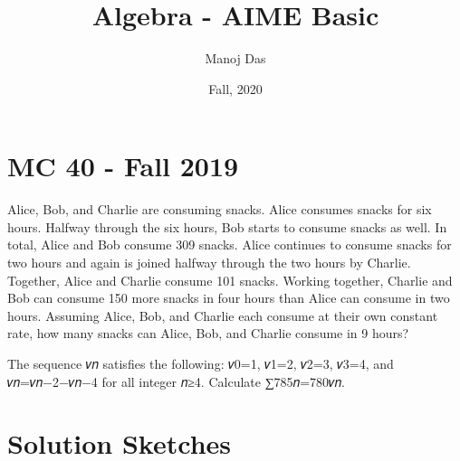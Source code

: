 \documentclass[11pt,twoside]{scrartcl}
\begin{document}
\title{Algebra - AIME Basic}

\author{Manoj Das}
\date{Fall, 2020}

\maketitle
\section{MC 40 - Fall 2019}
\begin{problem}
Alice, Bob, and Charlie are consuming snacks. Alice consumes snacks for six hours. Halfway through the six hours, Bob starts to consume snacks as well. In total, Alice and Bob consume 309 snacks. Alice continues to consume snacks for two hours and again is joined halfway through the two hours by Charlie. Together, Alice and Charlie consume 101 snacks. Working together, Charlie and Bob can consume 150 more snacks in four hours than Alice can consume in two hours. Assuming Alice, Bob, and Charlie each consume at their own constant rate, how many snacks can Alice, Bob, and Charlie consume in 9 hours?
\begin{sketch}
\end{sketch}
\end{problem}

\begin{problem}
    \begin{sketch}
        
    \end{sketch}
\end{problem}
The sequence 𝑣𝑛 satisfies the following: 𝑣0=1, 𝑣1=2, 𝑣2=3, 𝑣3=4, and 𝑣𝑛=𝑣𝑛−2−𝑣𝑛−4 for all integer 𝑛≥4. Calculate ∑785𝑛=780𝑣𝑛.

\begin{problem}
    \begin{sketch}
        
    \end{sketch}
\end{problem}

\newpage

\section{Solution Sketches}
\makehints
\end{document}
